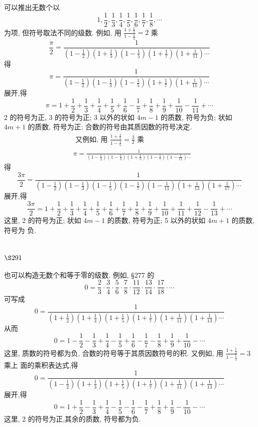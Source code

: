 可以推出无数个以
\[
1, \frac{1}{2}, \frac{1}{3}, \frac{1}{4}, \frac{1}{5}, \frac{1}{6}, \frac{1}{7}, \frac{1}{8}, \cdots
\]
为项, 但符号取法不同的级数. 例如, 用 $\frac{1+\frac{1}{3}}{1-\frac{1}{3}}=2$ 乘
\[
\frac{\pi}{2}=\frac{1}{\left(1-\frac{1}{2}\right)\left(1+\frac{1}{3}\right)\left(1-\frac{1}{5}\right)\left(1+\frac{1}{7}\right)\left(1+\frac{1}{11}\right) \cdots}
\]
得
\[
\pi=\frac{1}{\left(1-\frac{1}{2}\right)\left(1-\frac{1}{3}\right)\left(1-\frac{1}{5}\right)\left(1+\frac{1}{7}\right)\left(1+\frac{1}{11}\right) \cdots}
\]
展开,得
\[
\pi=1+\frac{1}{2}+\frac{1}{3}+\frac{1}{4}+\frac{1}{5}+\frac{1}{6}-\frac{1}{7}+\frac{1}{8}+\frac{1}{9}+\frac{1}{10}-\frac{1}{11}+\cdots
\]
2 的符号为正, 3 的符号为正; 3 以外的状如 $4 m-1$ 的质数, 符号为负; 状如 $4 m+1$ 的质数, 符号为正; 合数的符号由其质因数的符号决定.
\[
\begin{aligned}
& \text { 又例如, 用 } \frac{1+\frac{1}{5}}{1-\frac{1}{5}}=\frac{3}{2} \text { 乘 } \\
& \pi=\frac{1}{\left(1-\frac{1}{2}\right)\left(1-\frac{1}{3}\right)\left(1+\frac{1}{5}\right)\left(1-\frac{1}{7}\right)\left(1-\frac{1}{11}\right) \cdots}
\end{aligned}
\]
得
\[
\frac{3 \pi}{2}=\frac{1}{\left(1-\frac{1}{2}\right)\left(1-\frac{1}{3}\right)\left(1-\frac{1}{5}\right)\left(1-\frac{1}{7}\right)\left(1-\frac{1}{11}\right)\left(1+\frac{1}{13}\right)\left(1+\frac{1}{17}\right) \cdots}
\]
展开,得
\[
\frac{3 \pi}{2}=1+\frac{1}{2}+\frac{1}{3}+\frac{1}{4}+\frac{1}{5}+\frac{1}{6}+\frac{1}{7}+\frac{1}{8}+\frac{1}{9}+\frac{1}{10}+\frac{1}{11}+\frac{1}{12}-\frac{1}{13}+\cdots
\]
这里, 2 的符号为正; 状如 $4 m-1$ 的质数, 符号为正; 5 以外的状如 $4 m+1$ 的质数, 符号为 负.

\section{$\S 291$}

也可以构造无数个和等于零的级数. 例如, §277 的
\[
0=\frac{2}{3} \cdot \frac{3}{4} \cdot \frac{5}{6} \cdot \frac{7}{8} \cdot \frac{11}{12} \cdot \frac{13}{14} \cdot \frac{17}{18} \cdot \cdots
\]
可写成
\[
0=\frac{1}{\left(1+\frac{1}{2}\right)\left(1+\frac{1}{3}\right)\left(1+\frac{1}{5}\right)\left(1+\frac{1}{7}\right)\left(1+\frac{1}{11}\right)\left(1+\frac{1}{13}\right) \cdots}
\]
从而
\[
0=1-\frac{1}{2}-\frac{1}{3}+\frac{1}{4}-\frac{1}{5}+\frac{1}{6}-\frac{1}{7}-\frac{1}{8}+\frac{1}{9}+\frac{1}{10}-\cdots
\]
这里, 质数的符号都为负, 合数的符号等于其质因数符号的积. 又例如, 用 $\frac{1+\frac{1}{2}}{1-\frac{1}{2}}=3$ 乘上 面的乘积表达式,得
\[
0=\frac{1}{\left(1-\frac{1}{2}\right)\left(1+\frac{1}{3}\right)\left(1+\frac{1}{5}\right)\left(1+\frac{1}{7}\right)\left(1+\frac{1}{11}\right)\left(1+\frac{1}{13}\right) \cdots}
\]
展开,得
\[
0=1+\frac{1}{2}-\frac{1}{3}+\frac{1}{4}-\frac{1}{5}-\frac{1}{6}-\frac{1}{7}+\frac{1}{8}+\frac{1}{9}-\frac{1}{10}-\cdots
\]
这里, 2 的符号为正,其余的质数, 符号都为负.

